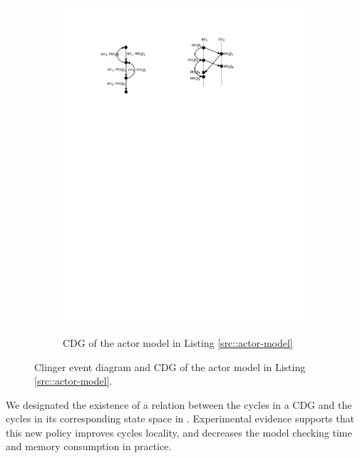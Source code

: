 \begin{figure}
\begin{subfigure}[b]{0.2\textwidth}
  \centering
  \small{
   \includegraphics[width=.8\textwidth]{resources/cdg.pdf}
  }
  \caption{CDG of the actor model in Listing \ref{src::actor-model}}
  \label{fig::cdg}
\end{subfigure}
\caption{Clinger event diagram and CDG of the actor model in Listing \ref{src::actor-model}.}
\label{fig::clinger-cdg}
\end{figure}

We designated 
the existence of a relation between the cycles in a CDG and the cycles in its corresponding state space in \cite{DBLP:journals/eceasst/KhamespanahSMSR15}. 
%
Experimental evidence supports that this new policy improves cycles locality, and decreases the model checking time and memory consumption in practice.

